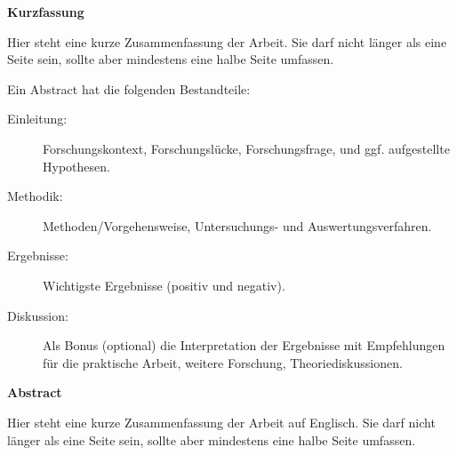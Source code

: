 \documentclass[../main]{subfiles}
\begin{document}
\vspace*{2cm}

\begin{center}
    \textbf{Kurzfassung}
\end{center}

\vspace*{1cm}

\noindent Hier steht eine kurze Zusammenfassung der Arbeit. Sie darf nicht länger als eine Seite sein, sollte aber mindestens eine halbe Seite umfassen.

Ein Abstract hat die folgenden Bestandteile:
\begin{description}
\item[Einleitung:] Forschungskontext, Forschungslücke, Forschungsfrage, und ggf. aufgestellte Hypothesen.
\item[Methodik:] Methoden/Vorgehensweise, Untersuchungs- und Auswertungsverfahren.
\item[Ergebnisse:] Wichtigste Ergebnisse (positiv und negativ).
\item[Diskussion:] Als Bonus (optional) die Interpretation der Ergebnisse mit Empfehlungen für die praktische Arbeit, weitere Forschung, Theoriediskussionen.
\end{description}

\vspace*{2cm}

\begin{center}
    \textbf{Abstract}
\end{center}

\vspace*{1cm}

\noindent Hier steht eine kurze Zusammenfassung der Arbeit auf Englisch. Sie darf nicht länger als eine Seite sein, sollte aber mindestens eine halbe Seite umfassen.
\end{document}
